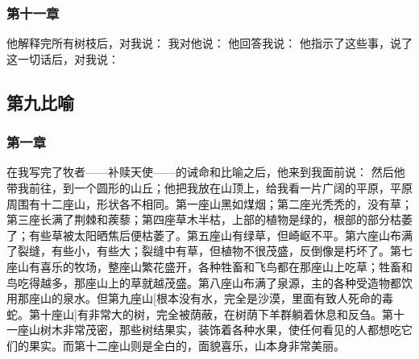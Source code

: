 
\subsubsection{第十一章}

他解释完所有树枝后，对我说： 我对他说： 他回答我说： 他指示了这些事，说了这一切话后，对我说：\par


\subsection{第九比喻}

\par


\subsubsection{第一章}

在我写完了牧者——补赎天使——的诫命和比喻之后，他来到我面前说： 然后他带我前往，到一个圆形的山丘；他把我放在山顶上，给我看一片广阔的平原，平原周围有十二座山，形状各不相同。第一座山黑如煤烟；第二座光秃秃的，没有草；第三座长满了荆棘和蒺藜；第四座草木半枯，上部的植物是绿的，根部的部分枯萎了；有些草被太阳晒焦后便枯萎了。第五座山有绿草，但崎岖不平。第六座山布满了裂缝，有些小，有些大；裂缝中有草，但植物不很茂盛，反倒像是朽坏了。第七座山有喜乐的牧场，整座山繁花盛开，各种牲畜和飞鸟都在那座山上吃草；牲畜和鸟吃得越多，那座山上的草就越茂盛。第八座山布满了泉源，主的各种受造物都饮用那座山的泉水。但第九座山[根本没有水，完全是沙漠，里面有致人死命的毒蛇。第十座山]有非常大的树，完全被荫蔽，在树荫下羊群躺着休息和反刍。第十一座山树木非常茂密，那些树结果实，装饰着各种水果，使任何看见的人都想吃它们的果实。而第十二座山则是全白的，面貌喜乐，山本身非常美丽。\par

